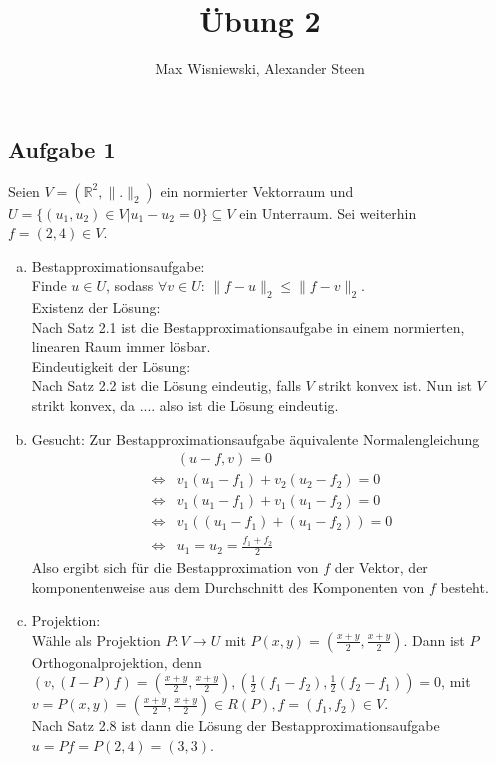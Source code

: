 \documentclass[11pt,a4paper,ngerman]{article}
\date{}
\title{Übung 2}
\author{Max Wisniewski, Alexander Steen}
\begin{document}

\renewcommand{\figurename}{Figure}

\maketitle
\thispagestyle{fancy}


\subsection*{Aufgabe 1}
Seien $V = (\mathbb{R}^2,\| . \|_2)$ ein normierter Vektorraum und
$U = \{(u_1,u_2) \in V| u_1 - u_2 = 0 \} \subseteq V$ ein Unterraum. Sei weiterhin $f = (2,4) \in V$.

\begin{enumerate}[a)]
\item Bestapproximationsaufgabe: \\
      Finde $u \in U$, sodass $\forall v \in U: \, \|f-u\|_2 \leq \|f-v\|_2$. \\
      Existenz der Lösung: \\
      Nach Satz 2.1 ist die Bestapproximationsaufgabe in einem normierten, linearen Raum immer lösbar. \\
      Eindeutigkeit der Lösung: \\
      Nach Satz 2.2 ist die Lösung eindeutig, falls $V$ strikt konvex ist. Nun ist $V$ strikt konvex, da
      ....
      also ist die Lösung eindeutig.
      
\item Gesucht: Zur Bestapproximationsaufgabe äquivalente Normalengleichung 
    \begin{equation*}\begin{split}
      & (u-f,v) = 0 \\
      \Leftrightarrow & v_1(u_1-f_1) + v_2(u_2-f_2) = 0 \\
      \Leftrightarrow & v_1(u_1-f_1) + v_1(u_1-f_2) = 0 \\
      \Leftrightarrow & v_1 \left( (u_1-f_1) + (u_1-f_2) \right) = 0 \\
      \Leftrightarrow & u_1 = u_2 = \frac{f_1+f_2}{2}
    \end{split}\end{equation*}
    Also ergibt sich für die Bestapproximation von $f$ der Vektor, der komponentenweise aus dem Durchschnitt
    des Komponenten von $f$ besteht.
\item Projektion: \\
    Wähle als Projektion $P : V \to U$ mit $P(x,y) = \left(\frac{x+y}{2},\frac{x+y}{2} \right)$. Dann ist $P$ Orthogonalprojektion, denn
    $(v,(I - P) f) = \left(\frac{x+y}{2},\frac{x+y}{2} \right),\left(\frac{1}{2}(f_1-f_2),\frac{1}{2}(f_2-f_1)\right) = 0$, mit $v = P(x,y) = \left(\frac{x+y}{2},\frac{x+y}{2} \right) \in R(P), f = (f_1,f_2) \in V$. \\
    Nach Satz 2.8 ist dann die Lösung der Bestapproximationsaufgabe $u = Pf = P(2,4) = (3,3)$.

\end{enumerate}
\end{document}
